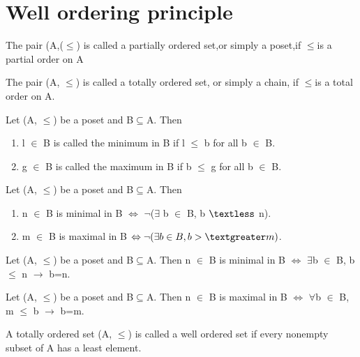 \documentclass[cn,10pt,math=newtx,citestyle=gb7714-2015,bibstyle=gb7714-2015]{elegantbook}
\begin{document}
\section{Well ordering principle}

\begin{definition}
    The pair (A,($\leq$) is called a partially ordered set,or simply a poset,if $\leq$is a partial order on A
\end{definition}

\begin{definition}
    The pair (A, $\leq$) is called a totally
ordered set, or simply a chain, if $\leq$is a total
order on A.
\end{definition}

\begin{definition}
    Let (A, $\leq$) be a poset and B$\subseteq$A. Then
    \begin{enumerate}
        \item l $\in$ B is called the minimum in B if l $\leq$ b for all b $\in$ B.
        \item g $\in$ B is called the maximum in B if b $\leq$ g for all b $\in$  B.
    \end{enumerate}
\end{definition}



\begin{definition}
     Let (A, $\leq$) be a poset and B$\subseteq$A. Then
     \begin{enumerate}
         \item n $\in$ B is minimal in B $\Leftrightarrow$ $\lnot$($\exists$ b $\in$ B, b $\textless$ n).
         \item m $\in$ B is maximal in B $\Leftrightarrow \lnot (\exists b \in B, b >\textgreater m)$.
     \end{enumerate}
\end{definition}


\begin{theorem}
    Let (A, $\leq$) be a poset and B$\subseteq$A. Then
n $\in$ B is minimal in B $\Leftrightarrow$ $\exists$b $\in$ B, b $\leq$ n $\to$ b=n.
\end{theorem}
\begin{theorem}
    Let (A, $\leq$) be a poset and B$\subseteq$A. Then
n $\in$  B is maximal in B $\Leftrightarrow$ $\forall$b $\in$ B, m $\leq$ b $\to$ b=m.
\end{theorem}

\begin{definition}
    A totally ordered set (A, $\leq$) is
called a well ordered set if every nonempty
subset of A has a least element.
\end{definition}
\end{document}

